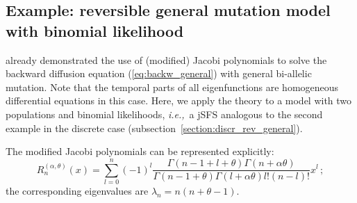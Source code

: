 \documentclass[preprint]{elsarticle}
\newcommand\given{{\,|\,}}
\newcommand\ie{{\it i.e.,}}
\begin{document}


\subsection{Example: reversible general mutation model with binomial likelihood}

\citet{Song12} already demonstrated the use of (modified) Jacobi polynomials to solve the backward diffusion equation (\ref{eq:backw_general}) with general bi-allelic mutation. Note that the temporal parts of all eigenfunctions are homogeneous differential equations in this case. Here, we apply the theory to a model with two populations and binomial likelihoods, \ie\ a jSFS analogous to the second example in the discrete case (subsection~\ref{section:discr_rev_general}). 

The modified Jacobi polynomials can be represented explicitly:
\begin{equation}
  R_n^{(\alpha,\theta)}(x)=\sum_{l=0}^n(-1)^l\frac{\Gamma(n-1+l+\theta)\Gamma(n+\alpha\theta)}{\Gamma(n-1+\theta)\Gamma(l+\alpha\theta)l!(n-l)!}x^l\,;
\end{equation}
the corresponding eigenvalues are $\lambda_n=n(n+\theta-1)$. 
\end{document}
